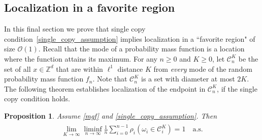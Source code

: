 \documentclass[11pt,reqno]{amsart}
\numberwithin{equation}{section}
\newtheorem{prop}[thm]{Proposition}
\theoremstyle{definition}
\begin{document}
\subsection{Localization in a favorite region}
In this final section we prove that single copy condition~\eqref{single_copy_assumption} implies localization in a ``favorite region" of size ${\mathcal{O}}(1)$.
Recall that the mode of a probability mass function is a location where the function attains its maximum. For any $n\ge 0$ and $K\ge 0$, let ${\mathcal{C}}_{n}^K$ be the set of all $x\in {\mathbb{Z}}^d$ that are within $\ell^1$ distance $K$ from {\it every} mode of the random probability mass function $f_n$. Note that ${\mathcal{C}}_n^K$ is a set with diameter at most $2K$. The following theorem establishes localization of the endpoint in ${\mathcal{C}}_n^K$, if the single copy condition holds.

\begin{prop}\label{localization_thm}
Assume  \eqref{mgf} and \eqref{single_copy_assumption}.
Then
{\begin{align} \begin{split} {
\lim_{K \to \infty} \liminf_{n \to \infty} \frac{1}{n} \sum_{i = 0}^{n-1} \rho_i(\omega_i \in {\mathcal{C}}_{i}^K) = 1\quad \mathrm{a.s.} \label{favorite_region}
} \end{split} \end{align}}
\end{prop}
\end{document}
